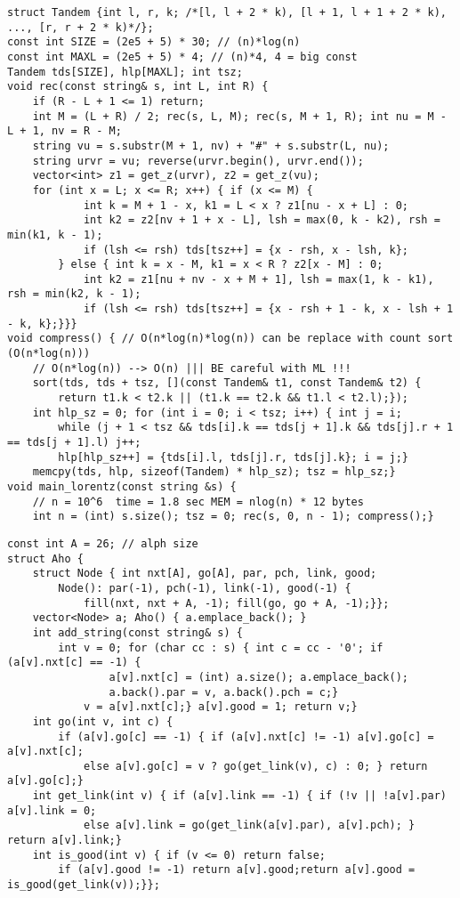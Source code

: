 \documentclass[12pt]{article}
\begin{document}
\begin{verbatim}
struct Tandem {int l, r, k; /*[l, l + 2 * k), [l + 1, l + 1 + 2 * k), ..., [r, r + 2 * k)*/};
const int SIZE = (2e5 + 5) * 30; // (n)*log(n)
const int MAXL = (2e5 + 5) * 4; // (n)*4, 4 = big const
Tandem tds[SIZE], hlp[MAXL]; int tsz;
void rec(const string& s, int L, int R) {
    if (R - L + 1 <= 1) return;
    int M = (L + R) / 2; rec(s, L, M); rec(s, M + 1, R); int nu = M - L + 1, nv = R - M;
    string vu = s.substr(M + 1, nv) + "#" + s.substr(L, nu);
    string urvr = vu; reverse(urvr.begin(), urvr.end());
    vector<int> z1 = get_z(urvr), z2 = get_z(vu);
    for (int x = L; x <= R; x++) { if (x <= M) {
            int k = M + 1 - x, k1 = L < x ? z1[nu - x + L] : 0;
            int k2 = z2[nv + 1 + x - L], lsh = max(0, k - k2), rsh = min(k1, k - 1);
            if (lsh <= rsh) tds[tsz++] = {x - rsh, x - lsh, k};
        } else { int k = x - M, k1 = x < R ? z2[x - M] : 0;
            int k2 = z1[nu + nv - x + M + 1], lsh = max(1, k - k1), rsh = min(k2, k - 1);
            if (lsh <= rsh) tds[tsz++] = {x - rsh + 1 - k, x - lsh + 1 - k, k};}}}
void compress() { // O(n*log(n)*log(n)) can be replace with count sort (O(n*log(n)))
    // O(n*log(n)) --> O(n) ||| BE careful with ML !!!
    sort(tds, tds + tsz, [](const Tandem& t1, const Tandem& t2) {
        return t1.k < t2.k || (t1.k == t2.k && t1.l < t2.l);});
    int hlp_sz = 0; for (int i = 0; i < tsz; i++) { int j = i; 
        while (j + 1 < tsz && tds[i].k == tds[j + 1].k && tds[j].r + 1 == tds[j + 1].l) j++;
        hlp[hlp_sz++] = {tds[i].l, tds[j].r, tds[j].k}; i = j;}
    memcpy(tds, hlp, sizeof(Tandem) * hlp_sz); tsz = hlp_sz;}
void main_lorentz(const string &s) {
    // n = 10^6  time = 1.8 sec MEM = nlog(n) * 12 bytes
    int n = (int) s.size(); tsz = 0; rec(s, 0, n - 1); compress();}
\end{verbatim}


\begin{verbatim}
const int A = 26; // alph size
struct Aho {
    struct Node { int nxt[A], go[A], par, pch, link, good;
        Node(): par(-1), pch(-1), link(-1), good(-1) {
            fill(nxt, nxt + A, -1); fill(go, go + A, -1);}};
    vector<Node> a; Aho() { a.emplace_back(); }
    int add_string(const string& s) {
        int v = 0; for (char cc : s) { int c = cc - '0'; if (a[v].nxt[c] == -1) {
                a[v].nxt[c] = (int) a.size(); a.emplace_back();
                a.back().par = v, a.back().pch = c;}
            v = a[v].nxt[c];} a[v].good = 1; return v;}
    int go(int v, int c) {
        if (a[v].go[c] == -1) { if (a[v].nxt[c] != -1) a[v].go[c] = a[v].nxt[c];
            else a[v].go[c] = v ? go(get_link(v), c) : 0; } return a[v].go[c];}
    int get_link(int v) { if (a[v].link == -1) { if (!v || !a[v].par) a[v].link = 0;
            else a[v].link = go(get_link(a[v].par), a[v].pch); } return a[v].link;}
    int is_good(int v) { if (v <= 0) return false;
        if (a[v].good != -1) return a[v].good;return a[v].good = is_good(get_link(v));}};
\end{verbatim}
\end{document}
